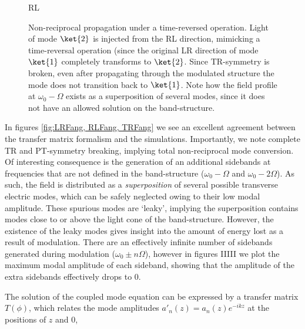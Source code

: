 \begin{figure}[t]
    \centering
    \setlength{\figH}{1\textwidth}
	\setlength{\figW}{1\textwidth}   
	
    \caption[Broken parity-reversal symmetry in the modulated structure]{RL}
    \label{fig:RLFang}
\end{figure}
    
\begin{figure}[t]
    \centering
    \setlength{\figH}{\textwidth}
	\setlength{\figW}{1\textwidth}
	
    \caption[Broken time-reversal symmetry in the modulated structure]{Non-reciprocal propagation under a time-reversed operation. Light of mode $\ket{2}$ is injected from the RL direction, mimicking a time-reversal operation (since the original LR direction of mode $\ket{1}$ completely transforms to $\ket{2}$. Since TR-symmetry is broken, even after propagating through the modulated structure the mode does not transition back to $\ket{1}$. Note how the field profile at $\omega_0-\Omega$ exists as a superposition of several modes, since it does not have an allowed solution on the band-structure.}
    \label{fig:TRFang}
\end{figure}    

In figures \ref{fig:LRFang, RLFang, TRFang} we see an excellent agreement between the transfer matrix formalism and the simulations. Importantly, we note complete TR and PT-symmetry breaking, implying total non-reciprocal mode conversion. Of interesting consequence is the generation of an additional sidebands at frequencies that are not defined in the band-structure ($\omega_0-\Omega$ and $\omega_0 - 2\Omega$). As such, the field is distributed as a \textit{superposition} of several possible transverse electric modes, which can be safely neglected owing to their low modal amplitude. These spurious modes are `leaky', implying the superposition contains modes close to or above the light cone of the band-structure. However, the existence of the leaky modes gives insight into the amount of energy lost as a result of modulation. There are an effectively infinite number of sidebands generated during modulation ($\omega_0 \pm n \Omega$), however in figures IIIII we plot the maximum modal amplitude of each sideband, showing that the amplitude of the extra sidebands effectively drops to 0. 

The solution of the coupled mode equation can be expressed by a transfer matrix $T(\phi)$, which relates the mode amplitudes $a'_n(z) = a_n(z)e^{-ikz}$ at the positions of $z$ and $0$,

